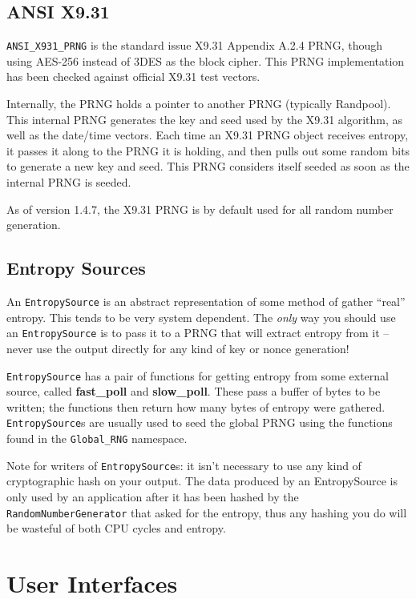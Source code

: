 \documentclass{article}
\newcommand{\function}[1]{\textbf{#1}}
\newcommand{\type}[1]{\texttt{#1}}
\newcommand{\namespace}[1]{\texttt{#1}}
\begin{document}
\subsection{ANSI X9.31}

\type{ANSI\_X931\_PRNG} is the standard issue X9.31 Appendix A.2.4 PRNG, though
using AES-256 instead of 3DES as the block cipher. This PRNG implementation has
been checked against official X9.31 test vectors.

Internally, the PRNG holds a pointer to another PRNG (typically
Randpool). This internal PRNG generates the key and seed used by the
X9.31 algorithm, as well as the date/time vectors. Each time an X9.31
PRNG object receives entropy, it passes it along to the PRNG it is
holding, and then pulls out some random bits to generate a new key and
seed. This PRNG considers itself seeded as soon as the internal PRNG
is seeded.

As of version 1.4.7, the X9.31 PRNG is by default used for all random number
generation.

\subsection{Entropy Sources}

An \type{EntropySource} is an abstract representation of some method of gather
``real'' entropy. This tends to be very system dependent. The \emph{only} way
you should use an \type{EntropySource} is to pass it to a PRNG that will
extract entropy from it -- never use the output directly for any kind of key or
nonce generation!

\type{EntropySource} has a pair of functions for getting entropy from
some external source, called \function{fast\_poll} and
\function{slow\_poll}. These pass a buffer of bytes to be written; the
functions then return how many bytes of entropy were
gathered. \type{EntropySource}s are usually used to seed the global
PRNG using the functions found in the \namespace{Global\_RNG}
namespace.

Note for writers of \type{EntropySource}s: it isn't necessary to use any kind
of cryptographic hash on your output. The data produced by an EntropySource is
only used by an application after it has been hashed by the
\type{RandomNumberGenerator} that asked for the entropy, thus any hashing
you do will be wasteful of both CPU cycles and entropy.

\section{User Interfaces}
\end{document}
